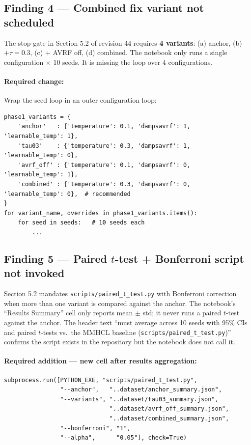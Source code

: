 \documentclass[11pt,a4paper]{article}
\newcommand{\xmark}{\ding{55}}
\begin{document}
\subsection*{Finding 4 \xmark{} --- Combined fix variant not scheduled}

The stop-gate in Section 5.2 of revision 44 requires \textbf{4 variants}: (a) anchor, (b) $+\tau = 0.3$, (c) + AVRF off, (d) combined. The notebook only runs a single configuration $\times$ 10 seeds. It is missing the loop over 4 configurations.

\paragraph{Required change:} Wrap the seed loop in an outer configuration loop:
\begin{lstlisting}
phase1_variants = {
    'anchor'   : {'temperature': 0.1, 'dampsavrf': 1, 'learnable_temp': 1},
    'tau03'    : {'temperature': 0.3, 'dampsavrf': 1, 'learnable_temp': 0},
    'avrf_off' : {'temperature': 0.1, 'dampsavrf': 0, 'learnable_temp': 1},
    'combined' : {'temperature': 0.3, 'dampsavrf': 0, 'learnable_temp': 0},  # recommended
}
for variant_name, overrides in phase1_variants.items():
    for seed in seeds:   # 10 seeds each
        ...
\end{lstlisting}

\subsection*{Finding 5 \xmark{} --- Paired $t$-test + Bonferroni script not invoked}

Section 5.2 mandates \texttt{scripts/paired\_t\_test.py} with Bonferroni correction when more than one variant is compared against the anchor. The notebook's ``Results Summary'' cell only reports mean $\pm$ std; it never runs a paired $t$-test against the anchor. The header text ``must average across 10 seeds with 95\% CIs and paired $t$-tests vs.\ the MMHCL baseline (\texttt{scripts/paired\_t\_test.py})'' confirms the script exists in the repository but the notebook does not call it.

\paragraph{Required addition --- new cell after results aggregation:}
\begin{lstlisting}
subprocess.run([PYTHON_EXE, "scripts/paired_t_test.py",
                "--anchor",   "..dataset/anchor_summary.json",
                "--variants", "..dataset/tau03_summary.json",
                              "..dataset/avrf_off_summary.json",
                              "..dataset/combined_summary.json",
                "--bonferroni", "1",
                "--alpha",      "0.05"], check=True)
\end{lstlisting}
\end{document}
